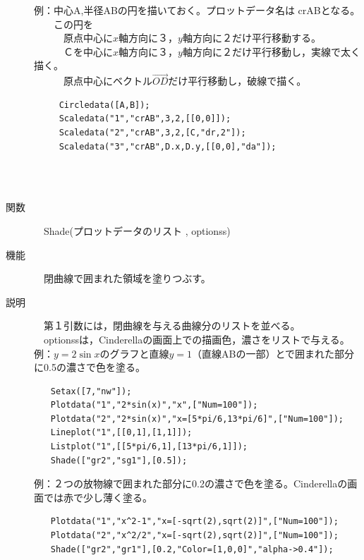 \documentclass[papersize,a4paper,12pt,uplatex]{jsarticle}
\begin{document}
\begin{description}
例：中心A,半径ABの円を描いておく。プロットデータ名は crABとなる。\\
　　この円を\\
　　　原点中心に$x$軸方向に３，$y$軸方向に２だけ平行移動する。\\
　　　Ｃを中心に$x$軸方向に３，$y$軸方向に２だけ平行移動し，実線で太く描く。\\
　　　原点中心にベクトル$\overrightarrow{OD} $だけ平行移動し，破線で描く。
\begin{verbatim}
　　　Circledata([A,B]);
　　　Scaledata("1","crAB",3,2,[[0,0]]);
　　　Scaledata("2","crAB",3,2,[C,"dr,2"]);
　　　Scaledata("3","crAB",D.x,D.y,[[0,0],"da"]);
\end{verbatim}
　　　　　　　\\
　\\
\hypertarget{shade}{}
\item[関数]　Shade(プロットデータのリスト , optionss)
\item[機能]　閉曲線で囲まれた領域を塗りつぶす。
\item[説明]　第１引数には，閉曲線を与える曲線分のリストを並べる。\\
　optionssは，Cinderellaの画面上での描画色，濃さをリストで与える。\\

例：$y=2\sin x$のグラフと直線$y=1$（直線ABの一部）とで囲まれた部分に0.5の濃さで色を塗る。
\begin{verbatim}
　　Setax([7,"nw"]);
　　Plotdata("1","2*sin(x)","x",["Num=100"]);
　　Plotdata("2","2*sin(x)","x=[5*pi/6,13*pi/6]",["Num=100"]);
　　Lineplot("1",[[0,1],[1,1]]);
　　Listplot("1",[[5*pi/6,1],[13*pi/6,1]]);
　　Shade(["gr2","sg1"],[0.5]);
\end{verbatim}
\begin{center}

\end{center}

例：２つの放物線で囲まれた部分に0.2の濃さで色を塗る。Cinderellaの画面では赤で少し薄く塗る。
\begin{verbatim}
　　Plotdata("1","x^2-1","x=[-sqrt(2),sqrt(2)]",["Num=100"]);
　　Plotdata("2","x^2/2","x=[-sqrt(2),sqrt(2)]",["Num=100"]);
　　Shade(["gr2","gr1"],[0.2,"Color=[1,0,0]","alpha->0.4"]);
\end{verbatim}
\begin{center}

\end{center}



\end{description}
\end{document}
